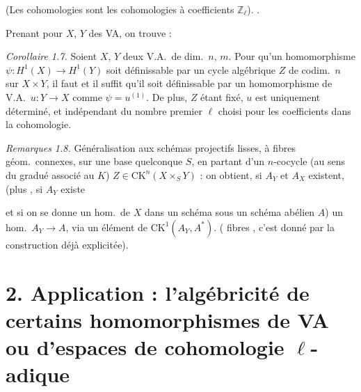 \documentclass[11pt,a4paper]{article}
\begin{document}

(Les cohomologies sont les cohomologies à coefficients $\mathbb{Z}_{\ell}$). .

 Prenant pour $X$, $Y$ des VA, on trouve :

\emph{Corollaire 1.7.}  Soient $X$, $Y$ deux V.A.\ de dim.\ $n$, $m$. Pour qu'un homomorphisme $\psi : H^{1}(X) \to H^{1}(Y)$ soit définissable par un cycle algébrique $Z$ de  codim.\ $n$ sur $X \times Y$, il faut et il suffit qu'il soit définissable par un homomorphisme de V.A.\ $u : Y \to X$ comme $\psi = u^{(1)}$. De plus, $Z$ étant fixé,  $u$ est uniquement déterminé, et indépendant du nombre premier $\ell$ choisi pour les coefficients dans la cohomologie.

\emph{Remarques 1.8.} Généralisation  aux schémas projectifs lisses, à fibres géom.\ connexes, sur une base quelconque $S$\struck{\ill{}}, en partant d'un $n$-cocycle (au sens du gradué associé au $K$) $Z \in \mathrm{CK}^{n}(X \times_S Y)$ : on obtient, si $A_Y$ et $A_X$ existent, (plus , si $A_Y$ existe

et si on se donne un hom.\ de $X$ dans un  schéma  sous un schéma abélien $A$) un hom.\ $A_Y \to A$, via un élément de $\mathrm{CK}^{1}(A_Y, A^{*})$. ( fibres  , c'est donné par la construction déjà explicitée).

\section*{2. Application : l'algébricité de certains homomorphismes de VA ou d'espaces de cohomologie $\ell$-adique}


\end{document}
